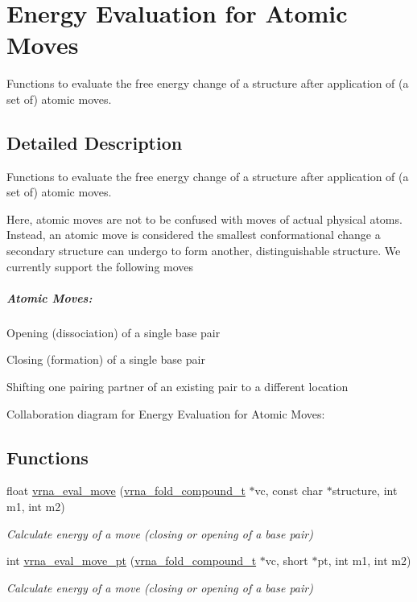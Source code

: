 \hypertarget{group__eval__move}{}\section{Energy Evaluation for Atomic Moves}
\label{group__eval__move}


Functions to evaluate the free energy change of a structure after application of (a set of) atomic moves.  




\subsection{Detailed Description}
Functions to evaluate the free energy change of a structure after application of (a set of) atomic moves. 

Here, atomic moves are not to be confused with moves of actual physical atoms. Instead, an atomic move is considered the smallest conformational change a secondary structure can undergo to form another, distinguishable structure. We currently support the following moves \subparagraph*{Atomic Moves\+:}


\begin{DoxyItemize}
\item Opening (dissociation) of a single base pair
\item Closing (formation) of a single base pair
\item Shifting one pairing partner of an existing pair to a different location 
\end{DoxyItemize}Collaboration diagram for Energy Evaluation for Atomic Moves\+:
\subsection*{Functions}
\begin{DoxyCompactItemize}
\item 
float \mbox{\hyperlink{group__eval__move_gaff1b9e4f4d17b434b0a822fe783672c1}{vrna\+\_\+eval\+\_\+move}} (\mbox{\hyperlink{group__fold__compound_ga1b0cef17fd40466cef5968eaeeff6166}{vrna\+\_\+fold\+\_\+compound\+\_\+t}} $\ast$vc, const char $\ast$structure, int m1, int m2)
\begin{DoxyCompactList}\small\item\em Calculate energy of a move (closing or opening of a base pair) \end{DoxyCompactList}\item 
int \mbox{\hyperlink{group__eval__move_ga123dabc119ea98c968a5e903cc46f0fb}{vrna\+\_\+eval\+\_\+move\+\_\+pt}} (\mbox{\hyperlink{group__fold__compound_ga1b0cef17fd40466cef5968eaeeff6166}{vrna\+\_\+fold\+\_\+compound\+\_\+t}} $\ast$vc, short $\ast$pt, int m1, int m2)
\begin{DoxyCompactList}\small\item\em Calculate energy of a move (closing or opening of a base pair) \end{DoxyCompactList}\end{DoxyCompactItemize}


